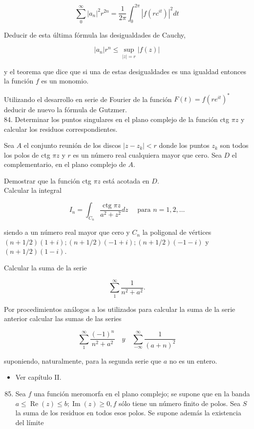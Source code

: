 \documentclass[10pt]{article}
\theoremstyle{plain}
\theoremstyle{definition}
\theoremstyle{remark}
\begin{document}
$$
\sum_{0}^{\infty}\left|a_{n}\right|^{2} r^{2 n}=\frac{1}{2 \pi} \int_{0}^{2 \pi}\left|f\left(r c^{i t}\right)\right|^{2} d t
$$

Deducir de esta última fórmula las desigualdades de Cauchy,

$$
\left|a_{n}\right| r^{n} \leqslant \sup _{|z|=r}|f(z)|
$$

y el teorema que dice que si una de estas desigualdades es una igualdad entonces la función $f$ es un monomio.

Utilizando el desarrollo en serie de Fourier de la función $F(t)=f\left(r e^{i t}\right)^{*}$ deducir de nuevo la fórmula de Gutzmer.\\
84. Determinar los puntos singulares en el plano complejo de la función ctg $\pi z$ y calcular los residuos correspondientes.

Sea $A$ el conjunto reunión de los discos $\left|z-z_{k}\right|<r$ donde los puntos $z_{k}$ son todos los polos de ctg $\pi z$ y $r$ es un número real cualquiera mayor que cero. Sea $D$ el complementario, en el plano complejo de $A$.

Demostrar que la función ctg $\pi z$ está acotada en $D$.\\
Calcular la integral

$$
I_{n}=\int_{C_{n}} \frac{\operatorname{ctg} \pi z}{a^{2}+z^{2}} d z \quad \text { para } n=1,2, \ldots
$$

siendo a un número real mayor que cero y $C_{n}$ la poligonal de vértices $(n+1 / 2)(1+i) ;(n+1 / 2)(-1+i) ;(n+1 / 2)(-1-i)$ y $(n+1 / 2)(1-i)$.

Calcular la suma de la serie

$$
\sum_{1}^{\infty} \frac{1}{n^{2}+a^{2}} .
$$

Por procedimientos análogos a los utilizados para calcular la suma de la serie anterior calcular las sumas de las series

$$
\sum_{1}^{\infty} \frac{(-1)^{n}}{n^{2}+a^{2}} \quad y \quad \sum_{-\infty}^{\infty} \frac{1}{(a+n)^{2}}
$$

suponiendo, naturalmente, para la segunda serie que $a$ no es un entero.

\begin{itemize}
  \item Ver capítulo II.
\end{itemize}

\begin{enumerate}
  \setcounter{enumi}{84}
  \item Sea $f$ una función meromorfa en el plano complejo; se supone que en la banda $a \leqslant \operatorname{Re}(z) \leqslant b ; \operatorname{Im}(z) \geqslant 0, f$ sólo tiene un número finito de polos. Sea $S$ la suma de los residuos en todos esos polos. Se supone además la existencia del límite
\end{enumerate}
\end{document}
